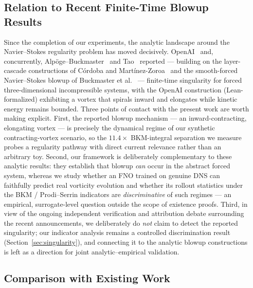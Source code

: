 \documentclass[review]{elsarticle}
\begin{document}
\subsection{Relation to Recent Finite-Time Blowup Results}
\label{sec:blowup-relation}

Since the completion of our experiments, the analytic landscape around the Navier--Stokes regularity problem has moved decisively. OpenAI~\cite{openai2026ns} and, concurrently, Alp\"oge--Buckmaster~\cite{alpoge2026euler} and Tao~\cite{tao2026blowup} reported --- building on the layer-cascade constructions of C\'ordoba and Mart\'inez-Zoroa~\cite{cordoba2023eulerforce} and the smooth-forced Navier--Stokes blowup of Buckmaster et al.~\cite{buckmaster2023ns} --- finite-time singularity for forced three-dimensional incompressible systems, with the OpenAI construction (Lean-formalized) exhibiting a vortex that spirals inward and elongates while kinetic energy remains bounded. Three points of contact with the present work are worth making explicit. First, the reported blowup mechanism --- an inward-contracting, elongating vortex --- is precisely the dynamical regime of our synthetic contracting-vortex scenario, so the $11.4\times$ BKM-integral separation we measure probes a regularity pathway with direct current relevance rather than an arbitrary toy. Second, our framework is deliberately complementary to these analytic results: they establish that blowup \emph{can} occur in the abstract forced system, whereas we study whether an FNO trained on genuine DNS can faithfully predict real vorticity evolution and whether its rollout statistics under the BKM / Prodi--Serrin indicators are \emph{discriminative} of such regimes --- an empirical, surrogate-level question outside the scope of existence proofs. Third, in view of the ongoing independent verification and attribution debate surrounding the recent announcements, we deliberately do \emph{not} claim to detect the reported singularity; our indicator analysis remains a controlled discrimination result (Section~\ref{sec:singularity}), and connecting it to the analytic blowup constructions is left as a direction for joint analytic--empirical validation.

\subsection{Comparison with Existing Work}
\label{sec:comparison}
\end{document}
